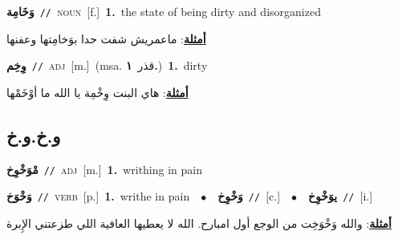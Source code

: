 \documentclass[10pt,a4paper,twoside]{article} %
\begin{document}
\begin{multicols}{2}
{\setlength\topsep{0pt}\textbf{\foreignlanguage{arabic}{وَخَامِة}}\ {\color{gray}\texttt{//}\color{black}}\ \textsc{noun}\ [f.]\ \textbf{1.}~the state of being dirty and disorganized\  \begin{flushright}\color{gray}\foreignlanguage{arabic}{\textbf{\underline{\foreignlanguage{arabic}{أمثلة}}}: ماعمريش شفت حدا بوَخامِتها وعفنها}\end{flushright}\color{black}} \vspace{2mm}

{\setlength\topsep{0pt}\textbf{\foreignlanguage{arabic}{وِخِم}}\ {\color{gray}\texttt{//}\color{black}}\ \textsc{adj}\ [m.]\ \color{gray}(msa. \foreignlanguage{arabic}{قذر}~\foreignlanguage{arabic}{\textbf{١.}})\color{black}\ \textbf{1.}~dirty\  \begin{flushright}\color{gray}\foreignlanguage{arabic}{\textbf{\underline{\foreignlanguage{arabic}{أمثلة}}}: هاي البنت وِخْمِة يا الله ما أوْخَمْها}\end{flushright}\color{black}} \vspace{2mm}

\vspace{-3mm}
\subsection*{\color{blue}\foreignlanguage{arabic}{و.خ.و.خ}\color{blue}{}} 

{\setlength\topsep{0pt}\textbf{\foreignlanguage{arabic}{مْوَخْوِخ}}\ {\color{gray}\texttt{//}\color{black}}\ \textsc{adj}\ [m.]\ \textbf{1.}~writhing in pain\ } \vspace{2mm}

{\setlength\topsep{0pt}\textbf{\foreignlanguage{arabic}{وَخْوَخ}}\ {\color{gray}\texttt{//}\color{black}}\ \textsc{verb}\ [p.]\ \textbf{1.}~writhe in pain\ \ $\bullet$\ \ \setlength\topsep{0pt}\textbf{\foreignlanguage{arabic}{وَخْوِخ}}\ {\color{gray}\texttt{//}\color{black}}\ [c.]\ \ $\bullet$\ \ \setlength\topsep{0pt}\textbf{\foreignlanguage{arabic}{يوَخْوِخ}}\ {\color{gray}\texttt{//}\color{black}}\ [i.]\  \begin{flushright}\color{gray}\foreignlanguage{arabic}{\textbf{\underline{\foreignlanguage{arabic}{أمثلة}}}: والله وَخْوَخِت من الوجع أول امبارح. الله لا يعطيها العافية اللي طزعتني الإِبرة}\end{flushright}\color{black}} \vspace{2mm}


\end{multicols}
\end{document}
